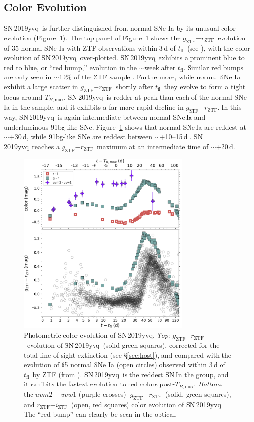 \documentclass[twocolumn]{aastex63}
\newcommand{\rztf}{$r_\mathrm{ZTF}$}
\newcommand{\gztf}{$g_\mathrm{ZTF}$}
\newcommand{\iztf}{$i_\mathrm{ZTF}$}
\newcommand{\tfl}{$t_\mathrm{fl}$}
\newcommand{\tbmax}{$T_{B,\mathrm{max}}$}
\newcommand{\sn}{SN\,2019yvq}
\begin{document}
\subsection{Color Evolution}

\sn\ is further distinguished from normal SNe Ia by its unusual color
evolution (Figure~\ref{fig:colors}). The top panel of Figure~\ref{fig:colors}
shows the \gztf$ - $\rztf\ evolution of 35 normal SNe Ia with ZTF observations
within 3\,d of \tfl\ (see \citealt{Bulla20}), with the color evolution of \sn\
over-plotted. \sn\ exhibits a prominent blue to red to blue, or ``red bump,''
evolution in the $\sim$week after \tfl. Similar red bumps are only seen in
$\sim$10\% of the ZTF sample \citep{Bulla20}. Furthermore, while normal SNe Ia
exhibit a large scatter in \gztf$ - $\rztf\ shortly after \tfl\ they evolve to
form a tight locus around \tbmax. \sn\ is redder at peak than each of the
normal SNe Ia in the \citet{Bulla20} sample, and it exhibits a far more rapid
decline in \gztf$ - $\rztf. In this way, \sn\ is again intermediate between
normal SNe\,Ia and underluminous 91bg-like SNe. Figure~\ref{fig:colors} shows
that normal SNe\,Ia are reddest at $\sim$+30\,d, while 91bg-like SNe are
reddest between $\sim$+10--15\,d \citet{Burns14}. \sn\ reaches a
\gztf$-$\rztf\ maximum at an intermediate time of $\sim$+20\,d.

\begin{figure}
    \centering
    \includegraphics[width=3.35in]{./figures/P48_colors.pdf}
    \caption{Photometric color evolution of \sn. \textit{Top}: \gztf$ -
    $\rztf\ evolution of \sn\ (solid green squares), corrected for the total
    line of sight extinction (see \S\ref{sec:host}), and compared with the
    evolution of 65 normal SNe Ia (open circles) observed within 3\,d of \tfl\
    by ZTF (from \citealt{Bulla20}). \sn\ is the reddest SN\,In the group, and
    it exhibits the fastest evolution to red colors post-\tbmax.
    \textit{Bottom}: the $uvm2 - uvw1$ (purple crosses), \gztf$ - $\rztf\
    (solid, green squares), and \rztf$ - $\iztf\ (open, red squares) color
    evolution of \sn. The ``red bump'' can clearly be seen in the optical.}
    \label{fig:colors}
\end{figure}
\end{document}
